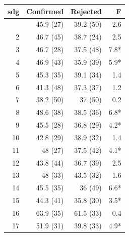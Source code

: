 \begin{table}[t]
\fontsize{12.0pt}{14.4pt}\selectfont
\begin{tabular*}{\linewidth}{@{\extracolsep{\fill}}rrrr}
\toprule
sdg & Confirmed & Rejected & F \\ 
\midrule\addlinespace[2.5pt]
1 & 45.9 (27) & 39.2 (50) & 2.6 \\ 
2 & 46.7 (45) & 38.7 (24) & 2.5 \\ 
3 & 46.7 (28) & 37.5 (48) & 7.8* \\ 
4 & 46.9 (43) & 35.9 (39) & 5.9* \\ 
5 & 45.3 (35) & 39.1 (34) & 1.4 \\ 
6 & 41.3 (48) & 37.3 (37) & 1.2 \\ 
7 & 38.2 (50) & 37 (50) & 0.2 \\ 
8 & 48.6 (38) & 38.5 (36) & 6.8* \\ 
9 & 45.5 (28) & 36.8 (29) & 4.2* \\ 
10 & 42.8 (29) & 38.9 (32) & 1.4 \\ 
11 & 48 (27) & 37.5 (42) & 4.1* \\ 
12 & 43.8 (44) & 36.7 (39) & 2.5 \\ 
13 & 48 (33) & 43.5 (32) & 1.6 \\ 
14 & 45.5 (35) & 36 (49) & 6.6* \\ 
15 & 44.3 (41) & 35.8 (30) & 3.5* \\ 
16 & 63.9 (35) & 61.5 (33) & 0.4 \\ 
17 & 51.9 (31) & 39.8 (33) & 4.9* \\ 
\bottomrule
\end{tabular*}
\end{table}

